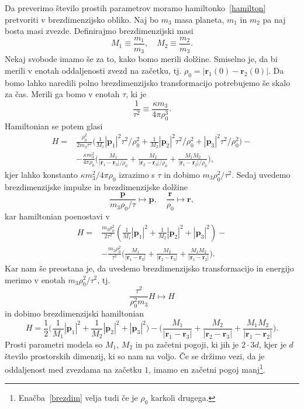 \documentclass[12pt, a4paper]{article}
\renewcommand{\r}{
    \ensuremath{\mathbf{r}}
}
\newcommand{\p}{
    \ensuremath{\mathbf{p}}
}
\newcommand{\sfrac}[2]{
    \ensuremath{\textstyle{\frac{#1}{#2}}}
}
\newcommand{\Frac}[2]{
    \ensuremath{\displaystyle{\frac{#1}{#2}}}
}
\begin{document}
Da preverimo \v stevilo prostih parametrov moramo hamiltonko~\eqref{hamilton} pretvoriti v brezdimenzijsko
obliko. Naj bo $m_3$ masa planeta, $m_1$ in $m_2$ pa naj bosta masi zvezde. Definirajmo brezdimenzijski
masi
\begin{equation}
    M_1 \equiv \frac{m_1}{m_3}, \quad M_2 \equiv \frac{m_2}{m_3}.
\end{equation}
Nekaj svobode imamo \v se za to, kako bomo merili dol\v zine. Smiselno je, da bi merili v enotah oddaljenosti
zvezd na za\v cetku, tj. $\rho_0 = |\r_1 (0) - \r_2 (0)|$. Da bomo lahko naredili polno brezdimenzijsko
transformacijo potrebujemo \v se skalo za \v cas. Merili ga bomo v enotah $\tau$, ki je
\[
    \frac{1}{\tau^2} \equiv \frac{\kappa m_3}{4\pi\rho_0^3}.
\]
Hamiltonian se potem glasi
\begin{align*}
    H =& \frac{\rho_0^2}{2 m_3\tau^2} \big(\sfrac{1}{M_1}|\p_1|^2\tau^2/\rho_0^2 + \sfrac{1}{M_2}|\p_2|^2\tau^2/\rho_0^2 +
        |\p_3|^2\tau^2/\rho_0^2\big) -\\
       &- \Frac{\kappa m_3^2}{4\pi\rho_0}\bigg(\Frac{M_1}{|\r_1 - \r_3|/\rho_0} + \Frac{M_2}{|\r_2 - \r_3|/\rho_0} +
        \Frac{M_1 M_2}{|\r_1 - \r_2|/\rho_0}\bigg),
\end{align*}
kjer lahko konstanto $\kappa m_3^2/4\pi\rho_0$ izrazimo s $\tau$ in dobimo $m_3\rho_0^2/\tau^2$.
Sedaj uvedemo brezdimenzijske impulze in brezdimenzijske dol\v zine
\begin{equation}
    \frac{\p}{m_3\rho_0/\tau} \mapsto \p, \quad \frac{\r}{\rho_0} \mapsto \r,
\end{equation}
kar hamiltonian poenostavi v
\begin{align*}
    H =& \frac{m_3\rho_0^2}{2\tau^2} (\sfrac{1}{M_1}|\p_1|^2 + \sfrac{1}{M_2}|\p_2|^2 + |\p_3|^2) -\\
       &- \Frac{m_3\rho_0^2}{\tau^2}\bigg(\Frac{M_1}{|\r_1 - \r_3|} + \Frac{M_2}{|\r_2 - \r_3|} +
        \Frac{M_1 M_2}{|\r_1 - \r_2|}\bigg).
\end{align*}
Kar nam \v se preostana je, da uvedemo brezdimenzijsko transformacijo in energijo merimo v enotah
$m_3\rho_0^2/\tau^2$, tj.
\[
    \frac{\tau^2}{\rho_0^2 m_3}H \mapsto H
\]
in dobimo brezdimenzijski hamiltonian
\begin{equation}
    H = \frac{1}{2}\Big(\sfrac{1}{M_1}|\p_1|^2 + \sfrac{1}{M_2}|\p_2|^2 + |\p_3|^2\Big)
        - \bigg(\Frac{M_1}{|\r_1 - \r_3|} + \Frac{M_2}{|\r_2 - \r_3|} + \Frac{M_1 M_2}{|\r_1 - \r_2|}\bigg).
    \label{brezdim}
\end{equation}
Prosti parametri modela so $M_1$, $M_2$ in pa za\v cetni pogoji, ki jih je $2 \cdot 3d$, kjer je $d$
\v stevilo prostorskih dimenzij, ki so nam na voljo. \v Ce se dr\v zimo vezi, da je oddaljenost med zvezdama
na za\v cetku $1$, imamo en za\v cetni pogoj manj\footnote{Ena\v cba~\eqref{brezdim} velja tudi \v ce je
$\rho_0$ karkoli drugega.}.
\end{document}
